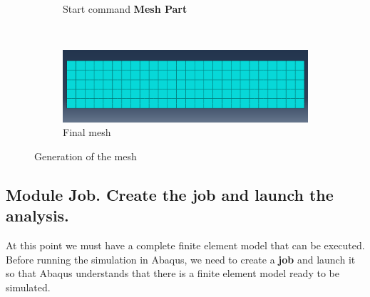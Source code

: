 \begin{enumerate}
\begin{figure}[H]
\begin{subfigure}{0.35\textwidth}
      \caption{Start command \textbf{Mesh Part} }
      \label{figu59}
    \end{subfigure}%
    ~ %
    \begin{subfigure}{0.60\textwidth}
      \includegraphics[width=\textwidth]{./body/images/imagen60}
      \caption{Final mesh}
      \label{figu60}
    \end{subfigure}%
    \caption{Generation of the mesh}
  \end{figure}
\end{enumerate}
\newpage
\subsection{Module Job. Create the job and launch the analysis.}

At this point we must have a complete finite element model that can be
executed. Before running the simulation in Abaqus, we need to create a
\textbf{job} and launch it so that Abaqus understands that there is a
finite element model ready to be simulated.

